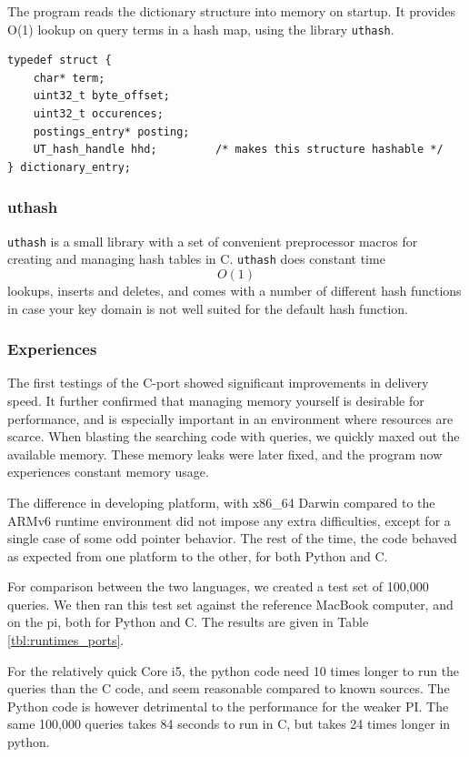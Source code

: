The program reads the dictionary structure into memory on startup. It provides O(1) lookup on query terms in a hash map, using the library {\tt uthash}\cite{uthash}.

\begin{lstlisting}[style=customc,captionpos=b,caption={Structure of a dictionary entry (term)}]
typedef struct {
    char* term;
    uint32_t byte_offset;
    uint32_t occurences;
    postings_entry* posting;
    UT_hash_handle hhd;         /* makes this structure hashable */
} dictionary_entry;
\end{lstlisting}
\subsubsection{uthash}
{\tt uthash} is a small library with a set of convenient preprocessor macros for creating and managing hash tables in C. 
{\tt uthash} does constant time $$O(1)$$ lookups, inserts and deletes, and comes with a number of different hash functions in case your key domain is not well suited for the default hash function. 

\subsubsection{Experiences}
The first testings of the C-port showed significant improvements in delivery speed.
It further confirmed that managing memory yourself is desirable for performance, and is especially important in an environment where resources are scarce. 
When blasting the searching code with queries, we quickly maxed out the available memory.
These memory leaks were later fixed, and the program now experiences constant memory usage. 

The difference in developing platform, with x86\_64 Darwin compared to the ARMv6 runtime environment did not impose any extra difficulties, except for a single case of some odd pointer behavior.
The rest of the time, the code behaved as expected from one platform to the other, for both Python and C.

For comparison between the two languages, we created a test set of 100,000 queries. We then ran this test set against the reference MacBook computer, and on the pi, both for Python and {C}. 
The results are given in Table \ref{tbl:runtimes_ports}. 

For the relatively quick {Core i5}, the python code need 10 times longer to run the queries than the C code, and seem reasonable compared to known sources.
The Python code is however detrimental to the performance for the weaker PI. The same 100,000 queries takes 84 seconds to run in C, but takes 24 times longer in python.

